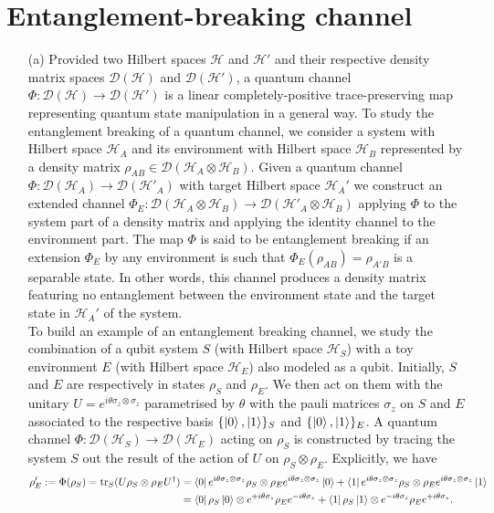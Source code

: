 \documentclass[10pt, a4paper]{article}
\begin{document}
{\section{Entanglement-breaking channel}

\begin{enumerate}
  \item[(a)] Provided two Hilbert spaces $\mathcal{H}$ and $\mathcal{H}'$ and their respective density matrix spaces $\mathcal{D}(\mathcal{H})$ and $\mathcal{D}(\mathcal{H}')$, a quantum channel $\Phi : \mathcal{D}(\mathcal{H}) \to \mathcal{D}(\mathcal{H}')$ is a linear completely-positive trace-preserving map representing quantum state manipulation in a general way. To study the entanglement breaking of a quantum channel, we consider a system with Hilbert space $\mathcal{H}_A$ and its environment with Hilbert space $\mathcal{H}_B$ represented by a density matrix $\rho_{AB} \in \mathcal{D}(\mathcal{H}_A \otimes \mathcal{H}_B)$.  Given a quantum channel $\Phi : \mathcal{D}(\mathcal{H}_A) \to \mathcal{D}(\mathcal{H}'_A)$ with target Hilbert space $\mathcal{H}_A'$ we construct an extended channel $\Phi_E : \mathcal{D}(\mathcal{H}_A \otimes \mathcal{H}_B) \to \mathcal{D}(\mathcal{H}'_A \otimes \mathcal{H}_B)$ applying $\Phi$ to the system part of a density matrix and applying the identity channel to the environment part. The map $\Phi$ is said to be entanglement breaking if an extension $\Phi_E$ by any environment is such that $\Phi_E(\rho_{AB}) = \rho_{A'B}$ is a separable state. In other words, this channel produces a density matrix featuring no entanglement between the environment state and the target state in $\mathcal{H}_{A}'$ of the system. \\
  
  To build an example of an entanglement breaking channel, we study the combination of a qubit system $S$ (with Hilbert space $\mathcal{H}_S$) with a toy environment $E$ (with Hilbert space $\mathcal{H}_E$) also modeled as a qubit. Initially, $S$ and $E$ are respectively in states $\rho_S$ and $\rho_E$. We then act on them with the unitary $U = e^{i \theta \sigma_z \otimes \sigma_z}$ parametrised by $\theta$ with the pauli matrices $\sigma_z$ on $S$ and $E$ associated to the respective basis $\{\ket{0}, \ket{1}\}_S$ and $\{\ket{0}, \ket{1}\}_E$. A quantum channel $\Phi : \mathcal{D}(\mathcal{H}_S) \to \mathcal{D}(\mathcal{H}_E)$ acting on $\rho_S$ is constructed by tracing the system $S$ out the result of the action of $U$ on $\rho_S\otimes\rho_E$. Explicitly, we have 
  \begin{align*}
    \rho_E' := \Phi(\rho_S) = \text{tr}_S (U \rho_S\otimes\rho_E U^\dagger) &= \bra{0} e^{i \theta \sigma_z \otimes \sigma_z}   \rho_S\otimes\rho_E e^{i \theta \sigma_z \otimes \sigma_z} \ket{0} + \bra{1} e^{i \theta \sigma_z \otimes \sigma_z}   \rho_S\otimes\rho_E e^{i \theta \sigma_z \otimes \sigma_z} \ket{1} \\
    &=   \bra{0}\rho_S \ket{0} \otimes e^{+i \theta \sigma_z} \rho_E e^{-i \theta \sigma_z} +   \bra{1}\rho_S\ket{1} \otimes e^{-i \theta \sigma_z} \rho_E  e^{+i \theta \sigma_z}.
  \end{align*}


\end{enumerate}}
\end{document}
